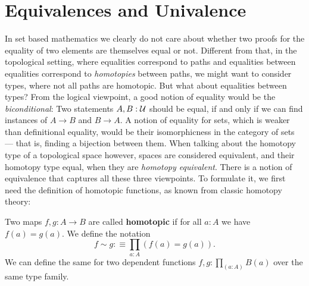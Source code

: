 \section{Equivalences and Univalence}

In set based mathematics we clearly do not care about whether two proofs for the
equality of two elements are themselves equal or not.
Different from that, in the topological setting, where equalities correspond to
paths and equalities between equalities correspond to \emph{homotopies} between
paths, we might want to consider types, where not all paths are homotopic.
But what about equalities between types?
From the logical viewpoint, a good notion of equality would be the \emph{biconditional}:
Two statements $A, B : \mathcal{U}$ should be equal, if and only if we can find
instances of $A \to B$ and $B \to A$.
A notion of equality for sets, which is weaker than definitional equality, would
be their isomorphicness in the category of sets --- that is, finding a bijection
between them.
When talking about the homotopy type of a topological space however, spaces are
considered equivalent, and their homotopy type equal, when they are \emph{homotopy
equivalent}.
There is a notion of equivalence that captures all these three viewpoints.
To formulate it, we first need the definition of homotopic functions, as known
from classic homotopy theory:

\begin{defn} \label{def:htpy-hott}
Two maps $f, g : A \to B$ are called \textbf{homotopic} if for all $a : A$ we have
$f(a) = g(a)$.
We define the notation
\begin{equation*}
f \sim g :\equiv \prod_{a : A} (f(a) = g(a)) \text{.}
\end{equation*}
We can define the same for two dependent functions $f, g : \prod_{(a : A)} B(a)$
over the same type family.
\end{defn}

